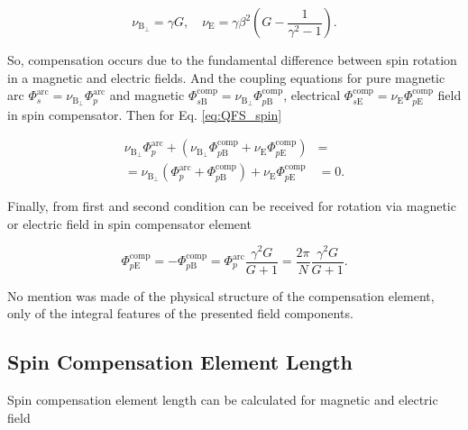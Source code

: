 \documentclass[a4paper,
               keeplastbox,   %
               ]{jacow}
\begin{document}
\begin{equation}
	\nu_{\mathrm{B}_{\perp}} = \gamma G, \quad \nu_{\mathrm{E}} = \gamma \beta^2 \left(G-\frac{1}{\gamma^{2}-1}\right).
	\label{eq:spin-tine}
\end{equation} 

\noindent So, compensation occurs due to the fundamental difference between spin rotation in a magnetic and electric fields. And the coupling equations for pure magnetic arc $\Phi_{s}^{\text{arc}} = \nu_{\mathrm{B}_{\perp}}\Phi_{p}^{\text{arc}}$ and magnetic $\Phi_{s\mathrm{B}}^{\text{comp}} = \nu_{\mathrm{B}_{\perp}}\Phi_{p\mathrm{B}}^{\text{comp}}$, electrical $\Phi_{s\mathrm{E}}^{\text{comp}} = \nu_{\mathrm{E}}\Phi_{p\mathrm{E}}^{\text{comp}}$ field in spin compensator. Then for Eq. \ref{eq:QFS_spin}

\begin{equation}
	\begin{aligned}
		\nu_{\mathrm{B}_{\perp}}\Phi_{p}^{\text{arc}} +
		\left(\nu_{\mathrm{B}_{\perp}}\Phi_{p\mathrm{B}}^{\text{comp}} +
		\nu_{\mathrm{E}}\Phi_{p\mathrm{E}}^{\text{comp}} \right) & = \\
		= \nu_{\mathrm{B}_{\perp}} \left( 
		\Phi_{p}^{\text{arc}} +
		\Phi_{p\mathrm{B}}^{\text{comp}} \right) +
		\nu_{\mathrm{E}}\Phi_{p\mathrm{E}}^{\text{comp}}  & = 0.
		\label{eq:deflection}
	\end{aligned}
\end{equation}

\par Finally, from first and second condition can be received for rotation via magnetic or electric field in spin compensator element

\begin{equation}
	\Phi_{p\mathrm{E}}^{\textrm{comp}} = - \Phi_{p\mathrm{B}}^{\textrm{comp}} = {\Phi}_{p}^{\text{arc}}\frac{\gamma^2 G}{G+1} =\frac{2\pi}{N}\frac{\gamma^2 G}{G+1}.
	\label{eq:deflection}
\end{equation}

\noindent No mention was made of the physical structure of the compensation element, only of the integral features of the presented field components.

\subsection{Spin Compensation Element Length}

Spin compensation element length can be calculated for magnetic and electric field
\end{document}

